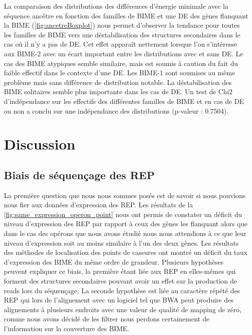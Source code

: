 \documentclass[12pt,a4paper]{report}
\begin{document}
\begin{onehalfspace}
La comparaison des distributions des différences d'énergie minimale avec la séquence ancêtre en fonction des familles de BIME et une DE des gènes flanquant la BIME (\autoref{fig:ancetreBoxplot}) nous permet d'observer la tendance pour toutes les familles de BIME vers une déstabilisation des structures secondaires dans le cas où il n'y a pas de DE. Cet effet apparaît nettement lorsque l'on s'intéresse aux BIME-2 avec un écart important entre les distributions avec et sans DE. Le cas des BIME atypiques semble similaire, mais est soumis à caution du fait du faible effectif dans le contexte d'une DE. Les BIME-1 sont soumises au même problème mais sans différence de distribution notable. La déstabilisation des BIME solitaires semble plus importante dans les cas de DE.
Un test de Chi2 d'indépendance sur les effectifs des différentes familles de BIME et en cas de DE ou non a conclu sur une indépendance des distributions (p-valeur : 0.7504).

\chapter*{Discussion}

\section*{Biais de séquençage des REP}

La première question que nous nous sommes posés est de savoir si nous pouvions nous fier aux données d'expression des REP. Les résultats de la \autoref{fig:same_expression_operon_point} nous ont permis de constater un déficit du niveau d'expression des REP par rapport à ceux des gènes les flanquant alors que dans le cas des opérons que nous avons étudié nous nous attendions à ce que leur niveau d'expression soit au moins similaire à l'un des deux gènes. Les résultats des méthodes de localisation des points de cassures ont montré un déficit du taux d'expression des BIME du même ordre de grandeur. Plusieurs hypothèses peuvent expliquer ce biais, la première étant liée aux REP en elles-mêmes qui forment des structures secondaires pouvant avoir un effet sur la production de reads lors du séquençage. La seconde hypothèse est liée au caractère répété des REP qui lors de l'alignement avec un logiciel tel que BWA peut produire des alignements à plusieurs endroits avec une valeur de qualité de mapping de zéro, comme nous avons décidé de les filtrer nous perdons certainement de l'information sur la couverture des BIME.


\end{onehalfspace}
\end{document}
